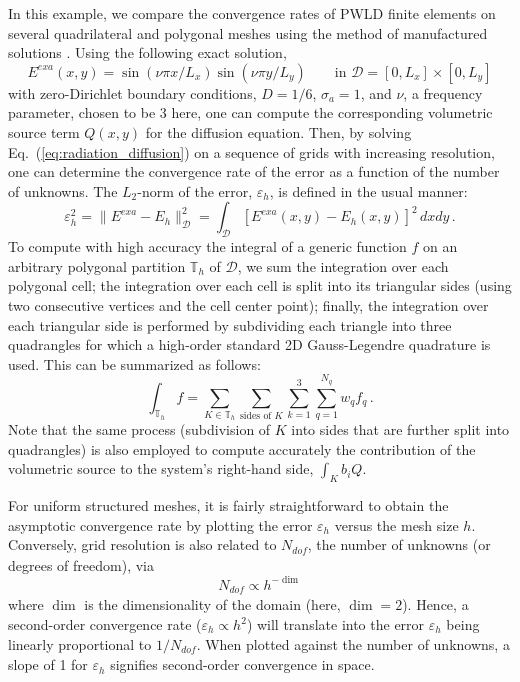 \documentclass[preprint,10pt]{elsarticle}
\newcommand{\D}{\mathcal{D}}
\newcommand{\eqt}[1]{Eq.~(\ref{#1})}                     %
\newcommand{\tf}{b}
\begin{document}
In this example, we compare the convergence rates of PWLD finite elements on several quadrilateral
and polygonal meshes using the method of manufactured solutions \cite{roache_2009}. Using the following exact solution,
\begin{equation} \label{eq:mms1}
	E^{\textit{exa}}(x,y) = \sin(\nu \pi x/L_x) \sin(\nu\pi y/L_y) \qquad \text{in } \D=[0,L_x]\times [0,L_y]
\end{equation}
with zero-Dirichlet boundary conditions, $D=1/6$, $\sigma_a=1$, and $\nu$, a frequency parameter, chosen to be 3 here, one can compute 
the corresponding volumetric source term $Q(x,y)$ for the diffusion equation. Then, by solving \eqt{eq:radiation_diffusion} 
on a sequence of
grids with increasing resolution, one can determine the convergence rate of the error
as a function of the number of unknowns. The $L_2$-norm of the error, $\varepsilon_h$, is defined in the usual manner:
\begin{equation}
	\varepsilon_h^2 = \| E^{\textit{exa}} - E_h \|^2_\D = \int_\D \left[ E^{\textit{exa}}(x,y)  - E_h(x,y) \right]^2 \, dxdy	\, .
\end{equation}
To compute with high accuracy the integral of a generic function $f$ on an arbitrary polygonal partition $\mathbb{T}_h$ of $\D$, 
we sum the integration over each polygonal cell; the integration over each cell is split into its triangular sides (using two 
consecutive vertices and the cell center point); finally, the integration over each triangular side is performed by 
subdividing each triangle into three quadrangles for which a high-order standard 2D Gauss-Legendre quadrature is used. 
This can be summarized as follows:
\begin{equation}
	\int_{\mathbb{T}_h} f  = \sum_{K\in \mathbb{T}_h} \sum_{\text{sides of }K} \sum_{k=1}^3 
	\sum_{q=1}^{N_q} w_q f_q
	\, .
\end{equation}
Note that the same process (subdivision of $K$ into sides that are further split into quadrangles) is also employed 
to compute accurately the contribution of the volumetric source to the system's right-hand side, $\int_K \tf_i Q$.

For uniform structured meshes, it is fairly straightforward to obtain the asymptotic convergence rate by plotting the error 
$\varepsilon_h$ versus the mesh size $h$. Conversely, grid resolution is also related to $N_\textit{dof}$, the number of unknowns 
(or degrees of freedom), via 
\begin{equation}
N_{\textit{dof}} \propto  h ^{-\dim} 
\end{equation}
where $\dim$ is the dimensionality of the domain (here, $\dim = 2$). Hence, a second-order convergence rate ($\varepsilon_h \propto h^2$)
will translate into the error $\varepsilon_h$ being linearly proportional to $1/N_{\textit{dof}}$. When plotted against the
number of unknowns, a slope of 1 for $\varepsilon_h$ signifies second-order convergence in space.
\end{document}
